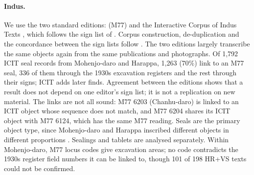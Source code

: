 \documentclass[11pt,a4paper]{article}
\begin{document}
\paragraph{Indus.} We use the two standard editions: \citet{mahadevan1977} (M77) and the Interactive Corpus of Indus Texts \citep[ICIT;][]{icit}, which follows the sign list of \citet{wells2015}.
Corpus construction, de-duplication and the concordance between the sign lists follow \citet{openindus2026corpus}.
The two editions largely transcribe the same objects again from the same publications and photographs.
Of 1,792 ICIT seal records from Mohenjo-daro and Harappa, 1,263 (70\%) link to an M77 seal, 336 of them through the 1930s excavation registers and the rest through their signs; ICIT adds later finds. %
Agreement between the editions shows that a result does not depend on one editor's sign list; it is not a replication on new material. %
The links are not all sound: M77 6203 (Chanhu-daro) is linked to an ICIT object whose sequence does not match, and M77 6204 shares its ICIT object with M77 6124, which has the same M77 reading. %
Seals are the primary object type, since Mohenjo-daro and Harappa inscribed different objects in different proportions \citep[p.~4]{fuls2024}.
Sealings and tablets are analysed separately.
Within Mohenjo-daro, M77 locus codes give excavation areas; no code contradicts the 1930s register field numbers it can be linked to, though 101 of 198 HR+VS texts could not be confirmed. %
\end{document}
